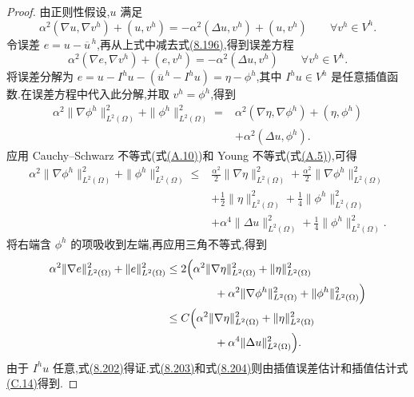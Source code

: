\begin{lemma}[以 $u$ 表示的离散微分滤波误差估计]
\begin{proof}
由正则性假设,$u$ 满足
\[
 \alpha^2(\nabla u,\nabla v^h)+(u,v^h)
 =-\alpha^2(\Delta u,v^h)+(u,v^h)
 \qquad\forall v^h\in V^h.
\]
令误差 $e=u-\overline{u}^{\,h}$,再从上式中减去式\hyperref[eq:leray-alpha-discrete-differential-filter]{(8.196)},得到误差方程
\begin{equation}\label{eq:leray-alpha-discrete-filter-error-equation}
 \alpha^2(\nabla e,\nabla v^h)+(e,v^h)
 =-\alpha^2(\Delta u,v^h)
 \qquad\forall v^h\in V^h.
\end{equation}
将误差分解为
$e=u-I^hu-(\overline{u}^{\,h}-I^hu)=\eta-\phi^h$,其中 $I^hu\in V^h$ 是任意插值函数.在误差方程中代入此分解,并取 $v^h=\phi^h$,得到
\[
\begin{aligned}
 \alpha^2\|\nabla\phi^h\|_{L^2(\Omega)}^2
  +\|\phi^h\|_{L^2(\Omega)}^2
 ={}&\alpha^2(\nabla\eta,\nabla\phi^h)
     +(\eta,\phi^h)\\
   &+\alpha^2(\Delta u,\phi^h).
\end{aligned}
\]
应用 Cauchy--Schwarz 不等式(式\hyperref[eq:appendix-a-10]{(A.10)})和 Young 不等式(式\hyperref[eq:appendix-a-5]{(A.5)}),可得
\[
\begin{aligned}
 \alpha^2\|\nabla\phi^h\|_{L^2(\Omega)}^2
  +\|\phi^h\|_{L^2(\Omega)}^2
 \le{}&
 \frac{\alpha^2}{2}\|\nabla\eta\|_{L^2(\Omega)}^2
 +\frac{\alpha^2}{2}\|\nabla\phi^h\|_{L^2(\Omega)}^2\\
 &+\frac12\|\eta\|_{L^2(\Omega)}^2
  +\frac14\|\phi^h\|_{L^2(\Omega)}^2\\
 &+\alpha^4\|\Delta u\|_{L^2(\Omega)}^2
  +\frac14\|\phi^h\|_{L^2(\Omega)}^2.
\end{aligned}
\]
将右端含 $\phi^h$ 的项吸收到左端,再应用三角不等式,得到
\[
\begin{aligned}
 \alpha^2\|\nabla e\|_{L^2(\Omega)}^2
  +\|e\|_{L^2(\Omega)}^2
 \le{}&2\Bigl(
   \alpha^2\|\nabla\eta\|_{L^2(\Omega)}^2+\|\eta\|_{L^2(\Omega)}^2\\
  &\qquad\quad+\alpha^2\|\nabla\phi^h\|_{L^2(\Omega)}^2
                 +\|\phi^h\|_{L^2(\Omega)}^2
  \Bigr)\\
 \le{}&C\Bigl(
   \alpha^2\|\nabla\eta\|_{L^2(\Omega)}^2+\|\eta\|_{L^2(\Omega)}^2\\
  &\qquad\quad+\alpha^4\|\Delta u\|_{L^2(\Omega)}^2
  \Bigr).
\end{aligned}
\]
由于 $I^hu$ 任意,式\hyperref[eq:leray-alpha-discrete-filter-error-best-approximation]{(8.202)}得证.式\hyperref[eq:leray-alpha-discrete-filter-H1-error]{(8.203)}和式\hyperref[eq:leray-alpha-discrete-filter-L2-error]{(8.204)}则由插值误差估计和插值估计式\hyperref[eq:interpolation-error-estimate]{(C.14)}得到.
\end{proof}
\end{lemma}

